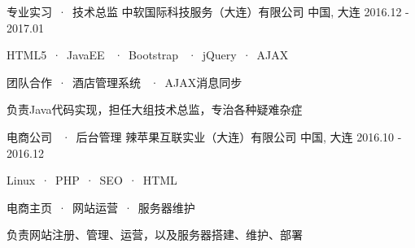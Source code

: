 

\begin{cventries}

  \cventrywork
    {专业实习\ ·\ 技术总监} %
    {中软国际科技服务（大连）有限公司} %
    {中国, 大连} %
    {2016.12 - 2017.01} %
    {
      \begin{cvitems} %
        \item {HTML5\ ·\ JavaEE \ ·\ Bootstrap \ ·\ jQuery\ ·\ AJAX}
        \item {团队合作\ ·\ 酒店管理系统 \ ·\ AJAX消息同步}
        \item {负责Java代码实现，担任大组技术总监，专治各种疑难杂症}
      \end{cvitems}
    }
    
  \cventrywork
    {电商公司 \ ·\ 后台管理} %
    {辣苹果互联实业（大连）有限公司} %
    {中国, 大连} %
    {2016.10 - 2016.12} %
    {
      \begin{cvitems} %
        \item {Linux\ ·\ PHP\ ·\ SEO\ ·\ HTML}
        \item {电商主页\ ·\ 网站运营\ ·\ 服务器维护}
        \item {负责网站注册、管理、运营，以及服务器搭建、维护、部署}
      \end{cvitems}
    }
    
\end{cventries}